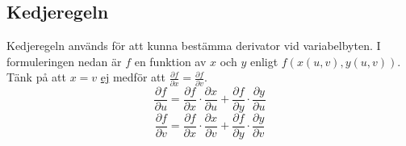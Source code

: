 \documentclass[10pt,a4paper]{article}
\begin{document}
\subsection{Kedjeregeln}
Kedjeregeln används för att kunna bestämma derivator vid variabelbyten. I formuleringen nedan är $f$ en funktion av $x$ och $y$ enligt $f(x(u,v),y(u,v))$. Tänk på att $x=v$ \underline{ej} medför att $\frac{\partial f}{\partial x} = \frac{\partial f}{\partial v}$.
\begin{equation}
\frac{\partial f}{\partial u}=\frac{\partial f}{\partial x}\cdot \frac{\partial x}{\partial u} + \frac{\partial f}{\partial y} \cdot \frac{\partial y}{\partial u}
\end{equation}
\begin{equation}
\frac{\partial f}{\partial v}=\frac{\partial f}{\partial x}\cdot \frac{\partial x}{\partial v} + \frac{\partial f}{\partial y} \cdot \frac{\partial y}{\partial v}
\end{equation}
\end{document}
